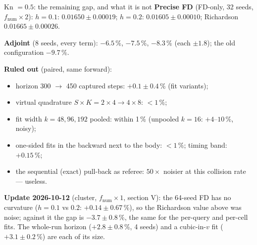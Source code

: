 \documentclass[10pt,aspectratio=169]{beamer}
\begin{document}
\begin{frame}{Kn $= 0.5$: the remaining gap, and what it is not}
\small
\textbf{Precise FD} (FD-only, 32 seeds, $f_{\mathrm{num}}\times2$): $h = 0.1$: $0.01650\pm0.00019$; $h = 0.2$:
$0.01605\pm0.00010$; Richardson $\mathbf{0.01665\pm0.00026}$.

\textbf{Adjoint} (8 seeds, every term):  $-6.5\,\%$,  $-7.5\,\%$,
 $-8.3\,\%$ (each $\pm1.8$); the old configuration $-9.7\,\%$.

\medskip
\textbf{Ruled out} (paired, same forward):
\begin{itemize}
\item horizon 300 $\to$ 450 captured steps: $+0.1\pm0.4\,\%$ (fit variants);
\item virtual quadrature $S\times K = 2\times4\to4\times8$: $<1\,\%$;
\item fit width $k = 48, 96, 192$ pooled: within 1\,\% (unpooled $k = 16$: $+4$--$10\,\%$, noisy);
\item one-sided fits in the backward next to the body: $<1\,\%$; timing band: $+0.15\,\%$;
\item the sequential (exact) pull-back as referee: $50\times$ noisier at this collision rate --- useless.
\end{itemize}
\textbf{Update 2026-10-12} (cluster, $f_{\mathrm{num}}\times1$, section V): the 64-seed FD has no curvature ($h = 0.1$ vs $0.2$:
$+0.14\pm0.67\,\%$), so the Richardson value above was noise; against it the gap is $-3.7\pm0.8\,\%$, the same for
the per-query and per-cell fits.  The whole-run horizon ($+2.8\pm0.8\,\%$, 4 seeds) and a cubic-in-$v$ fit
($+3.1\pm0.2\,\%$) are each of its size.
\end{frame}
\end{document}
